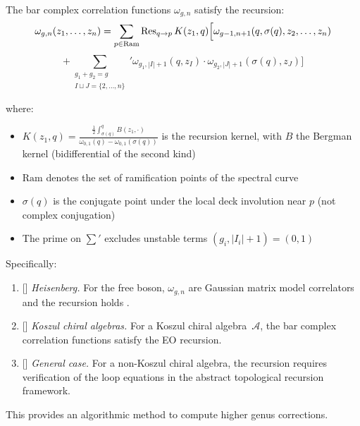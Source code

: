\begin{conjecture}\label{conj:EO-recursion}
The bar complex correlation functions $\omega_{g,n}$ satisfy the recursion:
\[\omega_{g,n}(z_1,\ldots,z_n) = \sum_{p \in \mathrm{Ram}} \operatorname{Res}_{q \to p} K(z_1, q) \Bigl[\omega_{g-1,n+1}(q,\sigma(q),z_2,\ldots,z_n)\]
\[+ {\sum_{\substack{g_1+g_2=g \\ I \sqcup J = \{2,\ldots,n\}}}}' \omega_{g_1,|I|+1}(q,z_I) \cdot \omega_{g_2,|J|+1}(\sigma(q),z_J)\Bigr]\]

where:
\begin{itemize}
\item $K(z_1,q) = \frac{\frac{1}{2}\int_{\sigma(q)}^q B(z_1, \cdot)}{\omega_{0,1}(q) - \omega_{0,1}(\sigma(q))}$ is the recursion kernel, with $B$ the Bergman kernel (bidifferential of the second kind)
\item $\mathrm{Ram}$ denotes the set of ramification points of the spectral curve
\item $\sigma(q)$ is the conjugate point under the local deck involution near $p$ (not complex conjugation)
\item The prime on $\sum'$ excludes unstable terms $(g_i, |I_i|+1) = (0,1)$
\end{itemize}

Specifically:
\begin{enumerate}
\item[\textup{(a)}] \textup{[\ClaimStatusProvedElsewhere]}
\emph{Heisenberg.} For the free boson, $\omega_{g,n}$ are Gaussian
matrix model correlators and the recursion holds
\cite{Eyn04,CEO06,EO07}.

\item[\textup{(b)}] \textup{[\ClaimStatusProvedHere]}
\emph{Koszul chiral algebras.} For a Koszul chiral
algebra~$\mathcal{A}$, the bar complex correlation functions
satisfy the EO recursion.

\item[\textup{(c)}] \textup{[\ClaimStatusConjectured]}
\emph{General case.} For a non-Koszul chiral algebra, the
recursion requires verification of the loop equations in the
abstract topological recursion framework.
\end{enumerate}

This provides an algorithmic method to compute higher genus corrections.
\end{conjecture}

